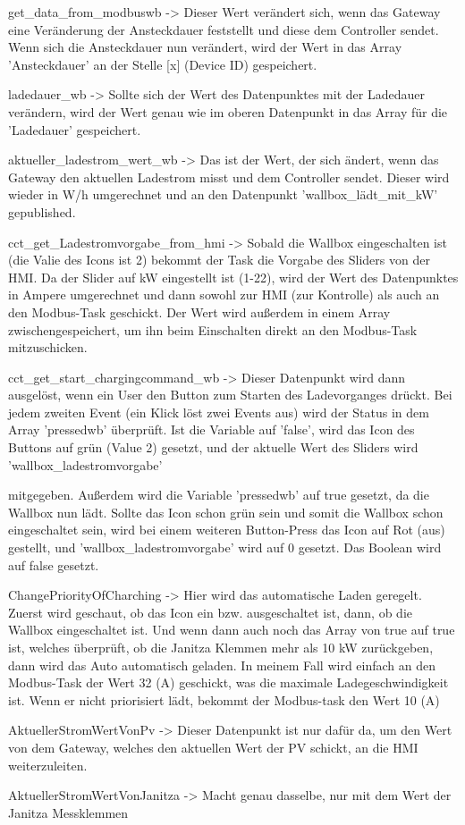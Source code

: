 \begin{compactitem}
  \item get\_data\_from\_modbuswb -> Dieser Wert verändert sich, wenn das Gateway eine Veränderung der Ansteckdauer feststellt und diese dem Controller sendet. Wenn sich die Ansteckdauer nun verändert, wird der Wert in das Array 'Ansteckdauer' an der Stelle [x] (Device ID) gespeichert.
  \item ladedauer\_wb -> Sollte sich der Wert des Datenpunktes mit der Ladedauer verändern, wird der Wert genau wie im oberen Datenpunkt in das Array für die 'Ladedauer' gespeichert.
  \item aktueller\_ladestrom\_wert\_wb -> Das ist der Wert, der sich ändert, wenn das Gateway den aktuellen Ladestrom misst und dem Controller sendet. Dieser wird wieder in W/h umgerechnet und an den Datenpunkt 'wallbox\_lädt\_mit\_kW' gepublished.
  \item cct\_get\_Ladestromvorgabe\_from\_hmi -> Sobald die Wallbox eingeschalten ist (die Valie des Icons ist 2) bekommt der Task die Vorgabe des Sliders von der HMI. Da der Slider auf kW eingestellt ist (1-22), wird der Wert des Datenpunktes in Ampere umgerechnet und dann sowohl zur HMI (zur Kontrolle) als auch an den Modbus-Task geschickt. Der Wert wird außerdem in einem Array zwischengespeichert, um ihn beim Einschalten direkt an den Modbus-Task mitzuschicken.
  \item cct\_get\_start\_chargingcommand\_wb -> Dieser Datenpunkt wird dann ausgelöst, wenn ein User den Button zum Starten des Ladevorganges drückt. Bei jedem zweiten Event (ein Klick löst zwei Events aus) wird der Status in dem Array 'pressedwb' überprüft. Ist die Variable auf 'false', wird das Icon des Buttons auf grün (Value 2) gesetzt, und der aktuelle Wert des Sliders wird 'wallbox\_ladestromvorgabe'
  \item
  mitgegeben. Außerdem wird die Variable 'pressedwb' auf true gesetzt, da die Wallbox nun lädt. Sollte das Icon schon grün sein und somit die Wallbox schon eingeschaltet sein, wird bei einem weiteren Button-Press das Icon auf Rot (aus) gestellt, und 'wallbox\_ladestromvorgabe' wird auf 0 gesetzt. Das Boolean wird auf false gesetzt.
  \item ChangePriorityOfCharching -> Hier wird das automatische Laden geregelt. Zuerst wird geschaut, ob das Icon ein bzw. ausgeschaltet ist, dann, ob die Wallbox eingeschaltet ist. Und wenn dann auch noch das Array von true auf true ist, welches überprüft, ob die Janitza Klemmen mehr als 10 kW zurückgeben, dann wird das Auto automatisch geladen. In meinem Fall wird einfach an den Modbus-Task der Wert 32 (A) geschickt, was die maximale Ladegeschwindigkeit ist. Wenn er nicht priorisiert lädt, bekommt der Modbus-task den Wert 10 (A)
  \item AktuellerStromWertVonPv -> Dieser Datenpunkt ist nur dafür da, um den Wert von dem Gateway, welches den aktuellen Wert der PV schickt, an die HMI weiterzuleiten.
  \item AktuellerStromWertVonJanitza -> Macht genau dasselbe, nur mit dem Wert der Janitza Messklemmen
\end{compactitem}

